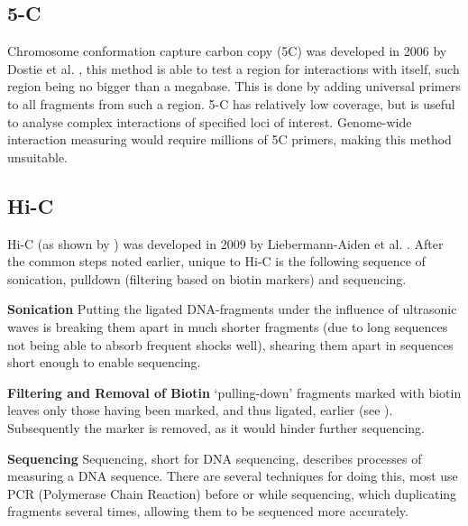 


\subsection{5-C}\label{sec:5C}

Chromosome conformation capture carbon copy (5C) was developed in 2006 by
Dostie et al. \cite{dostie2006chromosome}, this method is able to test a region
for interactions with itself, such region being no bigger than a megabase. This
is done by adding universal primers to all fragments from such a region.
5-C has relatively low coverage, but is useful to analyse complex interactions
of specified loci of interest. Genome-wide interaction measuring would require
millions of 5C primers, making this method unsuitable.







\subsection{Hi-C}\label{sec:HiC}

Hi-C (as shown by ) was developed in 2009 by Liebermann-Aiden et al.
\cite{lieberman2009comprehensive}. After the common steps noted earlier, unique
to Hi-C is the following sequence of sonication, pulldown (filtering based on
biotin markers) and sequencing.


\textbf{Sonication}\label{sec:sonication}
Putting the ligated DNA-fragments under the influence of ultrasonic waves is
breaking them apart in much shorter fragments (due to long sequences not being
able to absorb frequent shocks well), shearing them apart in sequences short
enough to enable sequencing.


\textbf{Filtering and Removal of Biotin}\label{sec:pulldown}
`pulling-down' fragments marked with biotin leaves only those having been
marked, and thus ligated, earlier (see ). Subsequently the
marker is removed, as it would hinder further sequencing.


\textbf{Sequencing}\label{sec:sequencing}
Sequencing, short for DNA sequencing, describes processes of measuring a DNA
sequence. There are several techniques for doing this, most use PCR (Polymerase
Chain Reaction) before or while sequencing, which duplicating fragments
several times, allowing them to be sequenced more accurately.

